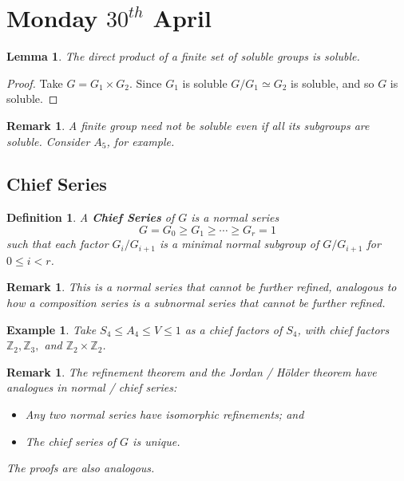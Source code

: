\documentclass[a4paper,10pt]{article}
\newcommand{\ZZ}{\mathbb{Z}}
\newtheorem{Def}[thm]{Definition}
\newtheorem{eg}[thm]{Example}
\newtheorem{Lem}[thm]{Lemma}
\newtheorem{rem}[thm]{Remark}
\begin{document}
\newpage
\section{Monday $30^{th}$ April}

\begin{Lem}
The direct product of a finite set of soluble groups is soluble. 
\end{Lem}

\begin{proof}
Take $G = G_1 \times G_2$. Since $G_1$ is soluble $G / G_1 \simeq G_2$ is soluble, and so $G$ is soluble. 
\end{proof}

\begin{rem}
A finite group need not be soluble even if all its subgroups are soluble. Consider $A_5$, for example.
\end{rem}


\subsection{Chief Series}
\begin{Def}
A \textbf{Chief Series} of $G$ is a normal series
\[ G = G_0 \geq G_1 \geq \cdots \geq G_r = 1 \]
such that each factor $G_{i} / G_{i+1}$ is a minimal normal subgroup of $G / G_{i + 1}$ for $0 \leq i < r$. 
\end{Def}

\begin{rem}
This is a normal series that cannot be further refined, analogous to how a composition series is a subnormal series that cannot be further refined. 
\end{rem}

\begin{eg}
Take $S_4 \leq A_4 \leq V \leq 1$ as a chief factors of $S_4$, with chief factors $\ZZ_2, \ZZ_3,$ and $\ZZ_2 \times \ZZ_2$. 
\end{eg}

\begin{rem}
The refinement theorem and the Jordan / H\"{o}lder theorem have analogues in normal / chief series:
\begin{itemize}
\item  Any two normal series have isomorphic refinements; and
\item The chief series of $G$ is unique. 
\end{itemize}
The proofs are also analogous. 
\end{rem}
\end{document}
